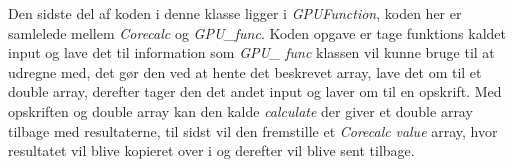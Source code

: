Den sidste del af koden i denne klasse ligger i \textit{GPUFunction}, koden her er samlelede mellem \textit{Corecalc} og \textit{GPU_func}. Koden opgave er tage funktions kaldet input og lave det til information som \textit{GPU\_ func} klassen vil kunne bruge til at udregne med, det gør den ved at hente det beskrevet array, lave det om til et double array, derefter tager den det andet input og laver om til en opskrift. Med opskriften og double array kan den kalde \textit{calculate} der giver et double array tilbage med resultaterne, til sidst vil den fremstille et \textit{Corecalc} \textit{value} array, hvor resultatet vil blive kopieret over i og derefter vil blive sent tilbage.